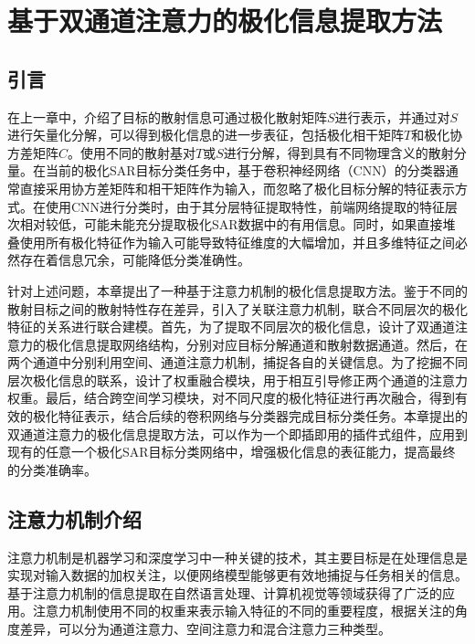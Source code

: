 \chapter{基于双通道注意力的极化信息提取方法}
\section{引言}
在上一章中，介绍了目标的散射信息可通过极化散射矩阵$S$进行表示，并通过对$S$进行矢量化分解，可以得到极化信息的进一步表征，包括极化相干矩阵$T$和极化协方差矩阵$C$。使用不同的散射基对$T$或$S$进行分解，得到具有不同物理含义的散射分量。在当前的极化SAR目标分类任务中，基于卷积神经网络（CNN）的分类器通常直接采用协方差矩阵和相干矩阵作为输入，而忽略了极化目标分解的特征表示方式\citing{}。在使用CNN进行分类时，由于其分层特征提取特性，前端网络提取的特征层次相对较低，可能未能充分提取极化SAR数据中的有用信息。同时，如果直接堆叠使用所有极化特征作为输入可能导致特征维度的大幅增加，并且多维特征之间必然存在着信息冗余，可能降低分类准确性\citing{}。


针对上述问题，本章提出了一种基于注意力机制的极化信息提取方法。鉴于不同的散射目标之间的散射特性存在差异，引入了关联注意力机制，联合不同层次的极化特征的关系进行联合建模。首先，为了提取不同层次的极化信息，设计了双通道注意力的极化信息提取网络结构，分别对应目标分解通道和散射数据通道。然后，在两个通道中分别利用空间、通道注意力机制，捕捉各自的关键信息。为了挖掘不同层次极化信息的联系，设计了权重融合模块，用于相互引导修正两个通道的注意力权重。最后，结合跨空间学习模块，对不同尺度的极化特征进行再次融合，得到有效的极化特征表示，结合后续的卷积网络与分类器完成目标分类任务。本章提出的双通道注意力的极化信息提取方法，可以作为一个即插即用的插件式组件，应用到现有的任意一个极化SAR目标分类网络中，增强极化信息的表征能力，提高最终的分类准确率。

\section{注意力机制介绍}
注意力机制是机器学习和深度学习中一种关键的技术，其主要目标是在处理信息是实现对输入数据的加权关注，以便网络模型能够更有效地捕捉与任务相关的信息。基于注意力机制的信息提取在自然语言处理、计算机视觉等领域获得了广泛的应用\citing{}。注意力机制使用不同的权重来表示输入特征的不同的重要程度，根据关注的角度差异，可以分为通道注意力、空间注意力和混合注意力三种类型。
